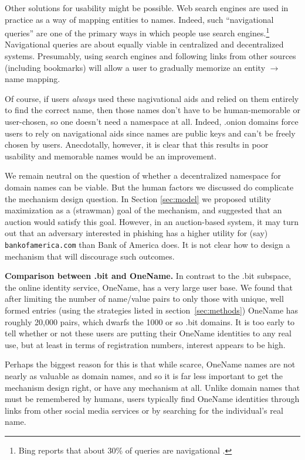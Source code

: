 Other solutions for usability might be possible. Web search engines are used in practice as a way of mapping entities to names. Indeed, such ``navigational queries'' are one of the primary ways in which people use search engines.\footnote{Bing reports that about 30\% of queries are navigational \cite{bing}.} Navigational queries are about equally viable in centralized and decentralized systems. Presumably, using search engines and following links from other sources (including bookmarks) will allow a user to gradually memorize an entity $\rightarrow$ name mapping. 

Of course, if users {\em always} used these nagivational aids and relied on them entirely to find the correct name, then those names don't have to be human-memorable or user-chosen, so one doesn't need a namespace at all. Indeed, .onion domains force users to rely on navigational aids since names are public keys and can't be freely chosen by users. Anecdotally, however, it is clear that this results in poor usability and memorable names would be an improvement.

We remain neutral on the question of whether a decentralized namespace for domain names can be viable. But the human factors we discussed do complicate the mechanism design question. In Section \ref{sec:model} we proposed utility maximization as a (strawman) goal of the mechanism, and suggested that an auction would satisfy this goal. However, in an auction-based system, it may turn out that an adversary interested in phishing has a higher utility for (say) {\tt bankofamerica.com} than Bank of America does. It is not clear how to design a mechanism that will discourage such outcomes.

{\bf Comparison between .bit and OneName.} In contrast to the .bit subspace, the online identity service, OneName, has a very large user base. We found that after limiting the number of name/value pairs to only those with unique, well formed entries (using the strategies listed in section~\ref{sec:methods}) OneName has roughly 20,000 pairs, which dwarfs the 1000 or so .bit domains. It is too early to tell whether or not these users are putting their OneName identities to any real use, but at least in terms of registration numbers, interest appears to be high.

Perhaps the biggest reason for this is that while scarce, OneName names are not nearly as valuable as domain names, and so it is far less important to get the mechanism design right, or have any mechanism at all. Unlike domain names that must be remembered by humans, users typically find OneName identities through links from other social media services or by searching for the individual's real name.

